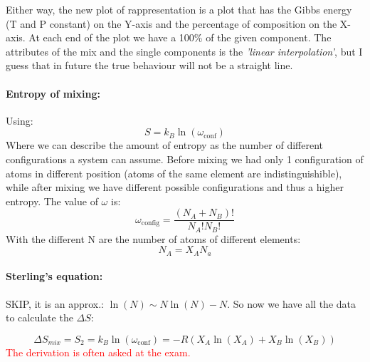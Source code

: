 \noindent Either way, the new plot of rappresentation is a plot that has the Gibbs energy (T and P constant) on the Y-axis and the percentage of composition on the X-axis. At each end of the plot we have a 100\% of the given component. The attributes of the mix and the single components is the \textit{'linear interpolation'}, but I guess that in future the true behaviour will not be a straight line.

\paragraph{Entropy of mixing:} Using:
\begin{equation}
    S = k_B \ln(\omega_{\text{conf}})
\end{equation}
Where we can describe the amount of entropy as the number of different configurations a system can assume. Before mixing we had only 1 configuration of atoms in different position (atoms of the same element are indistinguishible), while after mixing we have different possible configurations and thus a higher entropy. The value of $\omega$ is:
\begin{equation}
    \omega_{\text{config}} = \frac{(N_A + N_B)!}{N_A!N_B!}
\end{equation}
With the different N are the number of atoms of different elements: 
\begin{equation}
    N_A = X_A N_a
\end{equation}

\paragraph{Sterling's equation:} SKIP, it is an approx.: $\ln(N) \sim N\ln(N) - N$.
So now we have all the data to calculate the $\Delta S$:

\begin{equation}
    \Delta S_{mix} = S_2 = k_B\ln(\omega_{\text{conf}}) = -R(X_A\ln(X_A) + X_B\ln(X_B))
\end{equation}
\textcolor{red}{The derivation is often asked at the exam.}